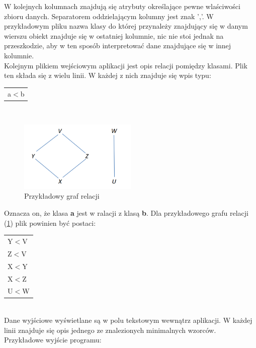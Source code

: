 \documentclass[a4paper,12pt]{article}
\begin{document}
W kolejnych kolumnach znajdują się atrybuty określające pewne wlaściwości zbioru danych. Separatorem oddzielającym kolumny jest znak ','. W przykładowym pliku nazwa klasy do której przynależy znajdujący się w danym wierszu obiekt znajduje się w ostatniej kolumnie, nic nie stoi jednak na przeszkodzie, aby w ten sposób interpretować dane znajdujące się w innej kolumnie. \\

Kolejnym plikiem wejściowym aplikacji jest opis relacji pomiędzy klasami. Plik ten składa się z wielu linii. W każdej z nich znajduje się wpis typu:\\

\begin{tabular}{l}
a$<$b \\
\end{tabular} \\

\begin{figure}[h!]
\begin{center}
\includegraphics[width=0.5\textwidth]{img/relations.png}
\caption{Przykładowy graf relacji}
\label{relat2}
\end{center}
\end{figure}

Oznacza on, że klasa {\bf a} jest w ralacji z klasą {\bf b}.
Dla przykładowego grafu relacji (\ref{relat2}) plik powinien być postaci: \\

\begin{tabular}{l}
Y$<$V \\
Z$<$V \\
X$<$Y \\
X$<$Z \\
U$<$W \\
\end{tabular}
\\

Dane wyjściowe wyświetlane są w polu tekstowym wewnątrz aplikacji. W każdej linii znajduje się opis jednego ze znalezionych minimalnych wzorców. Przykładowe wyjście programu: \\
\end{document}
